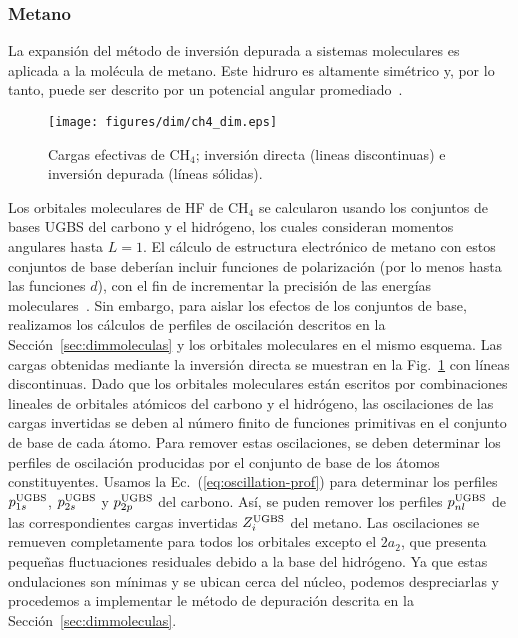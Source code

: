 \subsubsection*{Metano}

La expansión del método de inversión depurada a sistemas moleculares es 
aplicada a la molécula de metano. Este hidruro es altamente simétrico y, 
por lo tanto, puede ser descrito por un potencial angular  
promediado~\cite{Granados:16}. 

\begin{figure}[t]
\centering
\texttt{[image: figures/dim/ch4\_dim.eps]}
\caption[Cargas efectivas DIM de metano.]
{Cargas efectivas de CH$_4$; inversión directa (lineas discontinuas)
e inversión depurada (líneas sólidas).}
\label{fig:ch4zeff}
\end{figure}

Los orbitales moleculares de HF de CH$_4$ se calcularon usando los 
conjuntos de bases UGBS del carbono y el hidrógeno, los cuales 
consideran momentos angulares hasta $L=1$. El cálculo de estructura 
electrónico de metano con estos conjuntos de base deberían incluir 
funciones de polarización (por lo menos hasta las funciones $d$), con el 
fin de incrementar la precisión de las energías  
moleculares~\cite{Rothenberg:71,Hariharan:72}. Sin embargo, para aislar 
los efectos de los conjuntos de base, realizamos los cálculos de 
perfiles de oscilación descritos en la Sección~\ref{sec:dimmoleculas} y 
los orbitales moleculares en el mismo esquema. Las cargas obtenidas 
mediante la inversión directa se muestran en la Fig.~\ref{fig:ch4zeff} 
con líneas discontinuas. Dado que los orbitales moleculares están 
escritos por combinaciones lineales de orbitales atómicos del carbono y 
el hidrógeno, las oscilaciones de las cargas invertidas se deben al 
número finito de funciones primitivas en el conjunto de base de cada 
átomo. Para remover estas oscilaciones, se deben determinar los perfiles 
de oscilación producidas por el conjunto de base de los átomos 
constituyentes. Usamos la Ec.~(\ref{eq:oscillation-prof}) para 
determinar los perfiles $p_{1s}^{\mbox{\scriptsize UGBS}}$, 
$p_{2s}^{\mbox{\scriptsize UGBS}}$ y $p_{2p}^{\mbox{\scriptsize UGBS}}$ 
del carbono. Así, se puden remover los perfiles 
$p_{nl}^{\mbox{\scriptsize UGBS}}$ de las correspondientes cargas 
invertidas $Z_{i}^{\mbox{\scriptsize UGBS}}$ del metano. Las 
oscilaciones se remueven completamente para todos los orbitales excepto 
el $2a_2$, que presenta pequeñas fluctuaciones residuales debido a la 
base del hidrógeno. Ya que estas ondulaciones son mínimas y se ubican 
cerca del núcleo, podemos despreciarlas y procedemos a implementar le 
método de depuración descrita en la Sección~\ref{sec:dimmoleculas}. 


